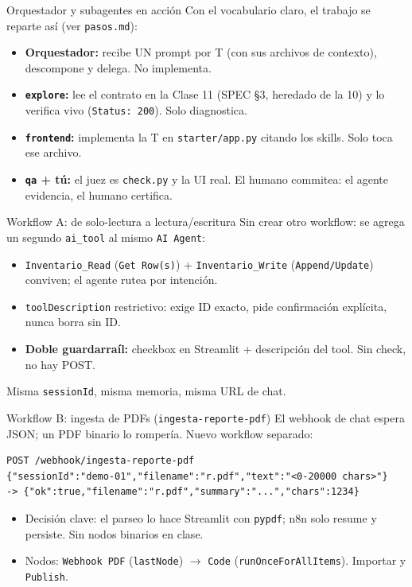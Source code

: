 \documentclass[aspectratio=169,11pt]{beamer}
\begin{document}
\begin{frame}{Orquestador y subagentes en acción}
  Con el vocabulario claro, el trabajo se reparte así (ver \texttt{pasos.md}):
  \begin{itemize}
    \item \textbf{Orquestador:} recibe UN prompt por T (con sus archivos de contexto), descompone y delega. No implementa.
    \item \textbf{\texttt{explore}:} lee el contrato en la Clase 11 (SPEC \S 3, heredado de la 10) y lo verifica vivo (\texttt{Status: 200}). Solo diagnostica.
    \item \textbf{\texttt{frontend}:} implementa la T en \texttt{starter/app.py} citando los skills. Solo toca ese archivo.
    \item \textbf{\texttt{qa} + tú:} el juez es \texttt{check.py} y la UI real. El humano commitea: el agente evidencia, el humano certifica.
  \end{itemize}
\end{frame}

\begin{frame}{Workflow A: de solo-lectura a lectura/escritura}
  Sin crear otro workflow: se agrega un segundo \texttt{ai\_tool} al mismo \texttt{AI Agent}:
  \begin{itemize}
    \item \texttt{Inventario\_Read} (\texttt{Get Row(s)}) + \texttt{Inventario\_Write} (\texttt{Append/Update}) conviven; el agente rutea por intención.
    \item \texttt{toolDescription} restrictivo: exige ID exacto, pide confirmación explícita, nunca borra sin ID.
    \item \textbf{Doble guardarraíl:} checkbox en Streamlit + descripción del tool. Sin check, no hay POST.
  \end{itemize}
  Misma \texttt{sessionId}, misma memoria, misma URL de chat.
\end{frame}

\begin{frame}[fragile]{Workflow B: ingesta de PDFs (\texttt{ingesta-reporte-pdf})}
  El webhook de chat espera JSON; un PDF binario lo rompería. Nuevo workflow separado:
\begin{lstlisting}
POST /webhook/ingesta-reporte-pdf
{"sessionId":"demo-01","filename":"r.pdf","text":"<0-20000 chars>"}
-> {"ok":true,"filename":"r.pdf","summary":"...","chars":1234}
\end{lstlisting}
  \begin{itemize}
    \item Decisión clave: el parseo lo hace Streamlit con \texttt{pypdf}; n8n solo resume y persiste. Sin nodos binarios en clase.
    \item Nodos: \texttt{Webhook PDF} (\texttt{lastNode}) $\to$ \texttt{Code} (\texttt{runOnceForAllItems}). Importar y \texttt{Publish}.
  \end{itemize}
\end{frame}
\end{document}
